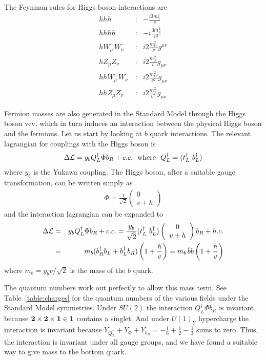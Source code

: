 \documentclass[12pt]{article}
\def\beq{\begin{eqnarray}}
\def\eeq{\end{eqnarray}}
\def\bea{\begin{eqnarray}}
\def\eea{\end{eqnarray}}
\begin{document}
The Feynman rules for Higgs boson interactions are
\bea
hhh & : & -\frac{i3m^2_h}{v} \\
hhhh & : & -i\frac{3m^2_h}{v^2} \\
hW^+_\mu W^-_\nu & : & i2\frac{m^2_W}{v}g^{\mu\nu} \\
hZ_\mu Z_\nu & : & i2\frac{m_Z^2}{v}g_{\mu\nu} \\
hhW^+_\mu W^-_\nu & : & i2\frac{m_W^2}{v^2}g_{\mu\nu} \\
hhZ_\mu Z_\nu & : & i2\frac{m_Z^2}{v^2}g_{\mu\nu}
\eea

Fermion masses are also generated in the Standard Model through the Higgs boson vev, which in turn induces an interaction between the physical Higgs boson and the fermions. Let us start by looking at $b$ quark interactions. The relevant lagrangian for couplings with the Higgs boson is
\beq
\Delta {\cal L}=y_b Q^\dagger_L \Phi b_R+c.c.~~{\rm where}~~Q^\dagger_L=(t^\dagger_L ~ b^\dagger_L)
\eeq
where $y_b$ is  the Yukawa coupling. The Higgs boson, after a suitable gauge transformation, can be written simply as
\beq
\Phi=\frac{1}{\sqrt{2}}\left( \begin{array}{c} 0 \\ v+h \end{array}\right)
\eeq
and the interaction lagrangian can be expanded to 
\bea
\Delta{\cal L} &=&y_bQ^\dagger_L \Phi b_R+c.c.=\frac{y_b}{\sqrt{2}}(t^\dagger_L~b^\dagger_L)
\left( \begin{array}{c} 0 \\ v+h \end{array}\right)b_R+h.c. \\
& = & m_b(b^\dagger_R b_L+b^\dagger_L b_R)\left( 1+\frac{h}{v}\right)=
m_b\, \bar b b\left( 1+\frac{h}{v}\right)
\eea
where $m_b=y_bv/\sqrt{2}$ is the  mass of the $b$ quark. 

The quantum numbers work out perfectly to allow this mass term. See Table~\ref{table:charges} for the quantum numbers of the various fields under the Standard Model symmetries. Under $SU(2)$ the interaction $Q_L^\dagger \Phi b_R$ is  invariant because ${\bf 2}\times {\bf 2}\times {\bf 1}\in {\bf 1}$ contains a singlet. And under $U(1)_Y$ hypercharge the interaction is invariant because $Y_{Q^\dagger_L}+Y_\Phi+Y_{b_R}=-\frac{1}{6}+\frac{1}{2}-\frac{1}{3}$ sums to zero.  Thus, the interaction is invariant under all gauge groups, and we have found a suitable way to give mass to the bottom quark.
\end{document}
